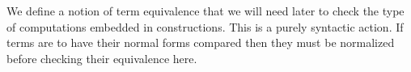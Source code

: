 We define a notion of term equivalence that we will need later
to check the type of computations embedded in constructions. This is a
purely syntactic action. If terms are to have their normal forms compared
then they must be normalized before checking their equivalence here.

\begin{code}%
\>[0]\AgdaSpace{}%
\AgdaSymbol{:}\AgdaSpace{}%
\AgdaSpace{}%
\AgdaSpace{}%
\AgdaSpace{}%
\AgdaSpace{}%
\AgdaSpace{}%
\AgdaSpace{}%
\AgdaSpace{}%
\<%
\\
\>[0]\AgdaSpace{}%
\AgdaSymbol{:}\AgdaSpace{}%
\AgdaSpace{}%
\AgdaSpace{}%
\AgdaSpace{}%
\AgdaSpace{}%
\AgdaSpace{}%
\AgdaSpace{}%
\AgdaSpace{}%
\AgdaSpace{}%
\AgdaSpace{}%
\<%
\end{code}
